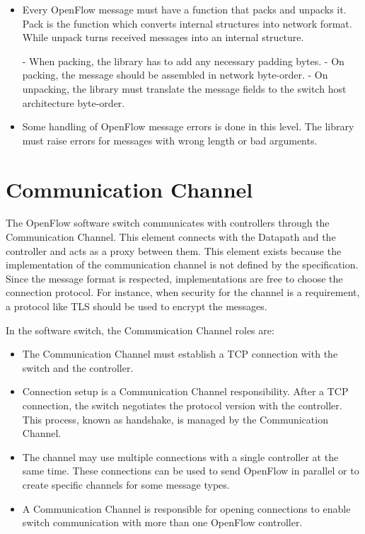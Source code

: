     \begin{itemize}
    
    \item Every OpenFlow message must have a function that packs and unpacks it. Pack is the function which converts internal structures into network format. While unpack turns received messages into an internal structure.
    
        \subitem - When packing, the library has to add any necessary padding bytes.
        \subitem - On packing, the message should be assembled in network byte-order.
        \subitem - On unpacking, the library must translate the message fields to the switch host architecture byte-order.
    
    \item Some handling of OpenFlow message errors is done in this level. The library must raise errors for messages with wrong length or bad arguments. 
    
    \end{itemize}

    \section{Communication Channel}	

    The OpenFlow software switch communicates with controllers through the Communication Channel. This element connects with the Datapath and the controller and acts as a proxy between them. This element exists because the implementation of the communication channel is not defined by the specification. Since the message format is respected, implementations are free to choose the connection protocol. For instance, when security for the channel is a requirement, a protocol like TLS should be used to encrypt the messages. 
    
    In the software switch, the Communication Channel roles are:
    
    \begin{itemize}
    
    \item The Communication Channel must establish a TCP connection with the switch and the controller.
    
    \item Connection setup is a Communication Channel responsibility. After a TCP connection, the switch negotiates the protocol version with the controller. This process, known as handshake, is managed by the Communication Channel. 
    
    \item The channel may use multiple connections with a single controller at the same time. These connections can be used to send OpenFlow in parallel or to create specific channels for some message types.
    
    \item A Communication Channel is responsible for opening connections to enable switch communication with more than one OpenFlow controller. 
    
    \end{itemize}
    
    
    